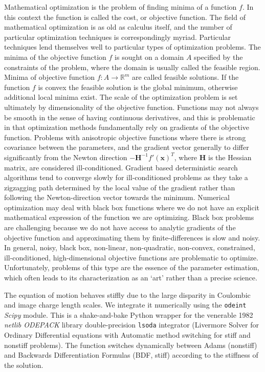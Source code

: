 \documentclass[12pt,a4paper,oneside]{book}
\begin{document}
Mathematical optimization is the problem of finding minima of a function $f$. In this context the function is called the cost, or objective function. The field of mathematical optimization is as old as calculus itself, and the number of particular optimization techniques is correspondingly myriad. Particular techniques lend themselves well to particular types of optimization problems. The minima of the objective function $f$ is sought on a domain $A$ specified by the constraints of the problem, where the domain is usually called the feasible region. Minima of objective function $f: A \rightarrow \mathbb{R}^m$ are called feasible solutions. If the function $f$ is convex the feasible solution is the global minimum, otherwise additional local minima exist. The scale of the optimization problem is set ultimately by dimensionality of the objective function. Functions may not always be smooth in the sense of having continuous derivatives, and this is problematic in that optimization methods fundamentally rely on gradients of the objective function. Problems with anisotropic objective functions where there is strong covariance between the parameters, and the gradient vector generally to differ significantly from the Newton direction $-\mathbf{H}^{-1} f' ( \mathbf{x} )^T$, where $\mathbf{H}$ is the Hessian matrix, are considered ill-conditioned. Gradient based deterministic search algorithms tend to converge slowly for ill-conditioned problems as they take a zigzagging path determined by the local value of the gradient rather than following the Newton-direction vector towards the minimum. Numerical optimization may deal with black box functions where we do not have an explicit mathematical expression of the function we are optimizing. Black box problems are challenging because we do not have access to analytic gradients of the objective function and approximating them by finite-differences is slow and noisy. In general, noisy, black box, non-linear, non-quadratic, non-convex, constrained, ill-conditioned, high-dimensional objective functions are problematic to optimize. Unfortunately, problems of this type are the essence of the parameter estimation, which often leads to its characterization as an `art' rather than a precise science.   

The equation of motion behaves stiffly due to the large disparity in Coulombic and image charge length scales. We integrate it numerically using the \verb|odeint| \emph{Scipy} module. This is a shake-and-bake Python wrapper for the venerable 1982 \emph{netlib ODEPACK} library double-precision \verb|lsoda| integrator\cite{hindmarsh_odepack_1983} (Livermore Solver for Ordinary Differential equations with Automatic method switching for stiff and nonstiff problems). The function switches dynamically between Adams (nonstiff) and Backwards Differentiation Formulas (BDF, stiff) according to the stiffness of the solution.
\end{document}
